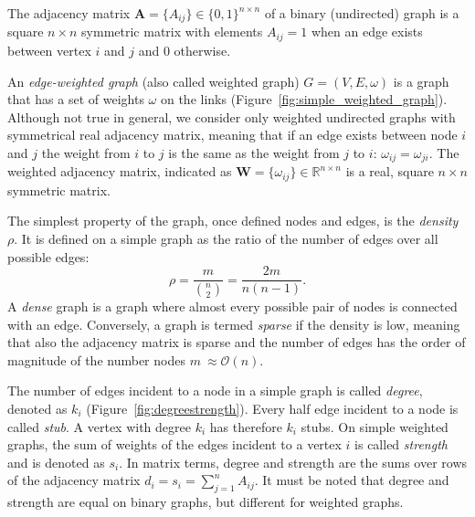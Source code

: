 
The adjacency matrix $\mathbf{A}=\{A_{ij}\} \in \{0,1\}^{n \times n}$ of a binary (undirected) graph is a square $n\times n$ symmetric matrix with elements $A_{ij}=1$ when an edge exists between vertex $i$ and $j$ and $0$ otherwise.

An \emph{edge-weighted graph} (also called weighted graph) $G=(V,E,\omega)$ is a graph that has a set of weights $\omega$ on the links (Figure~\ref{fig:simple_weighted_graph}). Although not true in general, we consider only weighted undirected graphs with symmetrical real adjacency matrix, meaning that if an edge exists between node $i$ and $j$ the weight from $i$ to $j$ is the same as the weight from $j$ to $i$: $\omega_{ij}=\omega_{ji}$. The weighted adjacency matrix,  indicated as $\mathbf{W}=\{ \omega_{ij} \} \in \mathbb{R}^{n\times n}$ is a real, square $n \times n$ symmetric matrix.

The simplest property of the graph, once defined nodes and edges, is the \emph{density} $\rho$. It is defined on a simple graph as the ratio of the number of edges over all possible edges:
\begin{equation}
\rho = \frac{m}{\binom{n}{2}} = \frac{2m}{n(n-1)}.
\end{equation}
A \emph{dense} graph is a graph where almost every possible pair of nodes is connected with an edge. Conversely, a graph is termed \emph{sparse} if the density is low, meaning that also the adjacency matrix is sparse and the number of edges has the order of magnitude of the number nodes $m ~\approx \mathcal{O}(n)$.

The number of edges incident to a node in a simple graph is called \emph{degree}, denoted as $k_i$ (Figure~\ref{fig:degreestrength}). Every half edge incident to a node is called \emph{stub}. A vertex with degree $k_i$ has therefore $k_i$ stubs.
On simple weighted graphs, the sum of weights of the edges incident to a vertex $i$ is called \emph{strength} and is denoted as $s_i$. 
In matrix terms, degree and strength are the sums over rows of the adjacency matrix $d_i=s_i=\sum_{j=1}^n A_{ij}$. It must be noted that degree and strength are equal on binary graphs, but different for weighted graphs.

